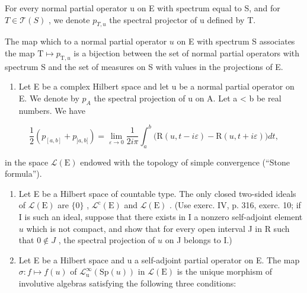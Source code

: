 For every normal partial operator u on E with spectrum equal to S, and for \(T \in \mathcal{T}(S)\) , we denote \(p_{T,u}\) the spectral projector of u defined by T.

The map which to a normal partial operator \(u\) on E with spectrum S associates the map \(\mathrm{T} \mapsto p_{\mathrm{T}, u}\) is a bijection between the set of normal partial operators with spectrum S and the set of measures on S with values in the projections of E.

\begin{enumerate}
\def\labelenumi{\arabic{enumi})}
\setcounter{enumi}{1}
\tightlist
\item
  Let E be a complex Hilbert space and let u be a normal partial operator on E. We denote by \(p_{A}\) the spectral projection of u on A. Let a \textless{} b be real numbers. We have
\end{enumerate}

\[
\frac {1}{2} (p _ {[ a, b ]} + p _ {] a, b [}) = \lim _ {\varepsilon \rightarrow 0} \frac {1}{2 i \pi} \int_ {a} ^ {b} \big (\mathrm{R} (u, t - i \varepsilon) - \mathrm{R} (u, t + i \varepsilon) \big) d t,
\]

in the space \(\mathcal{L}(\mathrm{E})\) endowed with the topology of simple convergence (“Stone formula”).

\begin{enumerate}
\def\labelenumi{\arabic{enumi})}
\setcounter{enumi}{2}
\item
  Let E be a Hilbert space of countable type. The only closed two-sided ideals of \(\mathcal{L}(\mathrm{E})\) are \(\{0\}\) , \(\mathcal{L}^{\mathrm{c}}(\mathrm{E})\) and \(\mathcal{L}(\mathrm{E})\) . (Use exerc. IV, p. 316, exerc. 10; if I is such an ideal, suppose that there exists in I a nonzero self-adjoint element \(u\) which is not compact, and show that for every open interval J in R such that \(0 \notin J\) , the spectral projection of \(u\) on J belongs to I.)
\item
  Let E be a Hilbert space and u a self-adjoint partial operator on E. The map \(\sigma\colon f\mapsto f(u)\) of \(\mathcal{L}_{\mathrm{u}}^{\infty}(\mathrm{Sp}(u))\) in \(\mathcal{L}(\mathrm{E})\) is the unique morphism of involutive algebras satisfying the following three conditions:
\end{enumerate}

